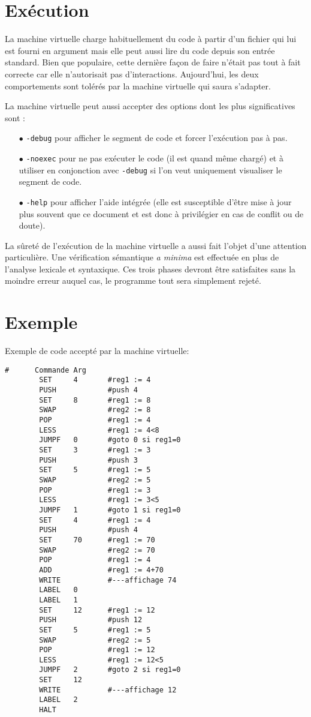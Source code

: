 \documentclass[12pt,a4]{article}
\begin{document}
\section{Exécution}
La machine virtuelle charge habituellement du code à partir d'un
fichier qui lui est fourni en argument mais elle peut aussi lire du
code depuis son entrée standard. Bien que populaire, cette dernière
façon de faire n'était pas tout à fait correcte car elle n'autorisait
pas d'interactions. Aujourd'hui, les deux comportements sont tolérés
par la machine virtuelle qui saura s'adapter.

La machine virtuelle peut aussi accepter des options dont les plus
significatives sont :
\begin{itemize}
\item[$\bullet$] {\tt -debug} pour afficher le segment de code et
forcer l'exécution pas à pas.
\item[$\bullet$] {\tt -noexec} pour ne pas exécuter le code (il est
quand même chargé) et à utiliser en conjonction avec {\tt -debug} si
l'on veut uniquement visualiser le segment de code.
\item[$\bullet$] {\tt -help} pour afficher l'aide intégrée (elle est
susceptible d'être mise à jour plus souvent que ce document et est
donc à privilégier en cas de conflit ou de doute).
\end{itemize}

La sûreté de l'exécution de la machine virtuelle a aussi fait l'objet
d'une attention particulière. Une vérification sémantique {\em a
minima} est effectuée en plus de l'analyse lexicale et syntaxique. Ces
trois phases devront être satisfaites sans la moindre erreur auquel
cas, le programme tout sera simplement rejeté.

\newpage
\section{Exemple}
Exemple de code accepté par la machine virtuelle:
\begin{verbatim}
#      Commande Arg
        SET     4       #reg1 := 4
        PUSH            #push 4
        SET     8       #reg1 := 8
        SWAP            #reg2 := 8
        POP             #reg1 := 4
        LESS            #reg1 := 4<8
        JUMPF   0       #goto 0 si reg1=0
        SET     3       #reg1 := 3
        PUSH            #push 3
        SET     5       #reg1 := 5
        SWAP            #reg2 := 5
        POP             #reg1 := 3
        LESS            #reg1 := 3<5
        JUMPF   1       #goto 1 si reg1=0
        SET     4       #reg1 := 4
        PUSH            #push 4
        SET     70      #reg1 := 70
        SWAP            #reg2 := 70
        POP             #reg1 := 4
        ADD             #reg1 := 4+70
        WRITE           #---affichage 74
        LABEL   0
        LABEL   1
        SET     12      #reg1 := 12
        PUSH            #push 12
        SET     5       #reg1 := 5
        SWAP            #reg2 := 5
        POP             #reg1 := 12 
        LESS            #reg1 := 12<5
        JUMPF   2       #goto 2 si reg1=0
        SET     12
        WRITE           #---affichage 12
        LABEL   2
        HALT
\end{verbatim}
\pagebreak
\end{document}
